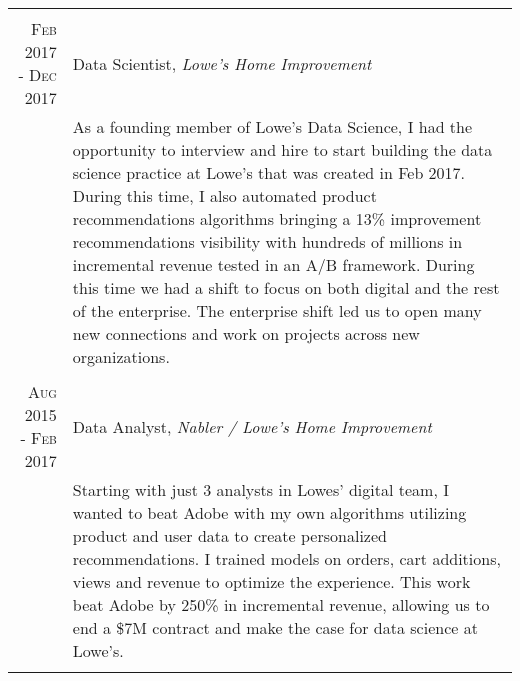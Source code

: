 \documentclass[a4paper, 9pt]{article} %
\begin{document}
\begin{tabular}{r|p{14cm}}
\multicolumn{2}{c}{} \\


\textsc{Feb 2017 - Dec 2017} & Data Scientist, \emph{Lowe's Home Improvement} \\
& \footnotesize{As a founding member of Lowe's Data Science, I had the opportunity to interview and hire to start building the data science practice at Lowe’s that was created in Feb 2017. During this time, I also automated product recommendations algorithms bringing a 13\% improvement recommendations visibility with hundreds of millions in incremental revenue tested in an A/B framework. During this time we had a shift to focus on both digital and the rest of the enterprise. The enterprise shift led us to open many new connections and work on projects across new organizations.}\\

\multicolumn{2}{c}{} \\


\textsc{Aug 2015 - Feb 2017} &  Data Analyst, \emph{Nabler / Lowe's Home Improvement} \\
& \footnotesize{Starting with just 3 analysts in Lowes’ digital team, I wanted to beat Adobe with my own algorithms utilizing product and user data to create personalized recommendations. I trained models on orders, cart additions, views and revenue to optimize the experience. This work beat Adobe by 250\% in incremental revenue, allowing us to end a \$7M contract and make the case for data science at Lowe’s.}\\

\multicolumn{2}{c}{} \\



\end{tabular}
\end{document}
